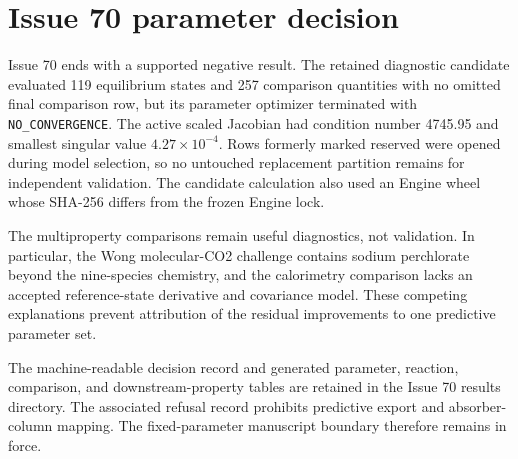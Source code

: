 \clearpage
\section{Issue 70 parameter decision}

Issue 70 ends with a supported negative result. The retained diagnostic
candidate evaluated 119 equilibrium states and 257 comparison quantities with
no omitted final comparison row, but its parameter optimizer terminated with
\texttt{NO\_CONVERGENCE}.  The active scaled Jacobian had condition number
4745.95 and smallest singular value $4.27\times10^{-4}$.  Rows formerly marked
reserved were opened during model selection, so no untouched replacement
partition remains for independent validation.  The candidate calculation also
used an Engine wheel whose SHA-256 differs from the frozen Engine lock.

The multiproperty comparisons remain useful diagnostics, not validation.  In
particular, the Wong molecular-CO2 challenge contains sodium perchlorate beyond
the nine-species chemistry, and the calorimetry comparison lacks an accepted
reference-state derivative and covariance model.  These competing explanations
prevent attribution of the residual improvements to one predictive parameter
set.

The machine-readable decision record and generated parameter, reaction,
comparison, and downstream-property tables are retained in the Issue 70
results directory.  The associated refusal record prohibits predictive export
and absorber-column mapping.  The fixed-parameter manuscript boundary
therefore remains in force.

